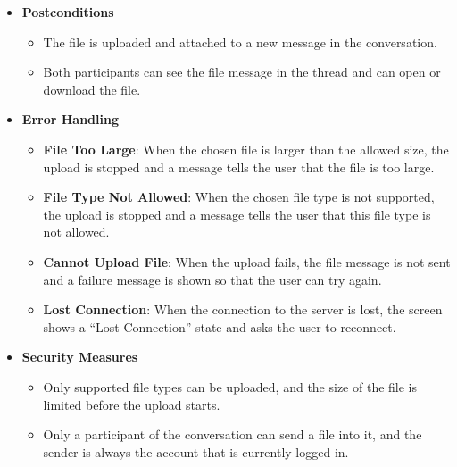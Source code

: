 \begin{itemize}[leftmargin=1.6em,topsep=4pt,itemsep=3pt,parsep=0pt,label=$\bullet$]
        \begin{itemize}[leftmargin=2.2em,topsep=2pt,itemsep=3pt,parsep=0pt,label=$\circ$]
            \item \textbf{Cancel the File Chooser}: When the user closes the file chooser without choosing a file, no upload is started and nothing changes.
            \item \textbf{Image Preview}: When the chosen file is an image, the picture is rendered directly inside the message bubble instead of a download card.
        \end{itemize}
    \item \textbf{Postconditions}

        \begin{itemize}[leftmargin=2.2em,topsep=2pt,itemsep=3pt,parsep=0pt,label=$\circ$]
            \item The file is uploaded and attached to a new message in the conversation.
            \item Both participants can see the file message in the thread and can open or download the file.
        \end{itemize}
    \item \textbf{Error Handling}

        \begin{itemize}[leftmargin=2.2em,topsep=2pt,itemsep=3pt,parsep=0pt,label=$\circ$]
            \item \textbf{File Too Large}: When the chosen file is larger than the allowed size, the upload is stopped and a message tells the user that the file is too large.
            \item \textbf{File Type Not Allowed}: When the chosen file type is not supported, the upload is stopped and a message tells the user that this file type is not allowed.
            \item \textbf{Cannot Upload File}: When the upload fails, the file message is not sent and a failure message is shown so that the user can try again.
            \item \textbf{Lost Connection}: When the connection to the server is lost, the screen shows a ``Lost Connection'' state and asks the user to reconnect.
        \end{itemize}
    \item \textbf{Security Measures}

        \begin{itemize}[leftmargin=2.2em,topsep=2pt,itemsep=3pt,parsep=0pt,label=$\circ$]
            \item Only supported file types can be uploaded, and the size of the file is limited before the upload starts.
            \item Only a participant of the conversation can send a file into it, and the sender is always the account that is currently logged in.
        \end{itemize}
\end{itemize}

